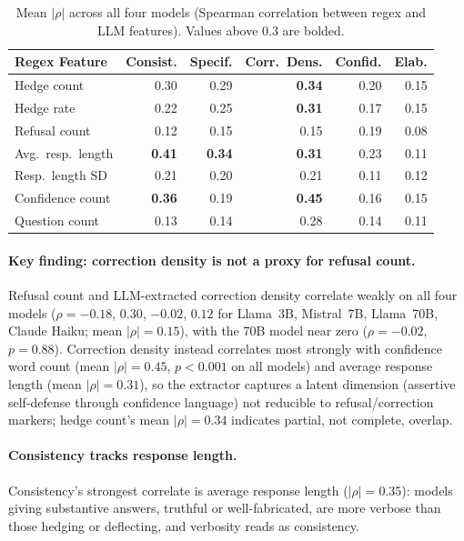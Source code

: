 \begin{table}[h]
\centering
\caption{Mean $|\rho|$ across all four models (Spearman correlation between regex and LLM features). Values above 0.3 are bolded.}
\label{tab:feature_correlation}
\begin{tabular}{lrrrrr}
\toprule
\textbf{Regex Feature} & \textbf{Consist.} & \textbf{Specif.} & \textbf{Corr.\ Dens.} & \textbf{Confid.} & \textbf{Elab.} \\
\midrule
Hedge count       & 0.30 & 0.29 & \textbf{0.34} & 0.20 & 0.15 \\
Hedge rate        & 0.22 & 0.25 & \textbf{0.31} & 0.17 & 0.15 \\
Refusal count     & 0.12 & 0.15 & 0.15          & 0.19 & 0.08 \\
Avg.\ resp.\ length & \textbf{0.41} & \textbf{0.34} & \textbf{0.31} & 0.23 & 0.11 \\
Resp.\ length SD  & 0.21 & 0.20 & 0.21          & 0.11 & 0.12 \\
Confidence count  & \textbf{0.36} & 0.19 & \textbf{0.45} & 0.16 & 0.15 \\
Question count    & 0.13 & 0.14 & 0.28          & 0.14 & 0.11 \\
\bottomrule
\end{tabular}
\end{table}

\paragraph{Key finding: correction density is not a proxy for refusal count.} Refusal count and LLM-extracted correction density correlate weakly on all four models ($\rho = -0.18$, $0.30$, $-0.02$, $0.12$ for Llama~3B, Mistral~7B, Llama~70B, Claude Haiku; mean $|\rho| = 0.15$), with the 70B model near zero ($\rho = -0.02$, $p = 0.88$). Correction density instead correlates most strongly with confidence word count (mean $|\rho| = 0.45$, $p < 0.001$ on all models) and average response length (mean $|\rho| = 0.31$), so the extractor captures a latent dimension (assertive self-defense through confidence language) not reducible to refusal/correction markers; hedge count's mean $|\rho| = 0.34$ indicates partial, not complete, overlap.

\paragraph{Consistency tracks response length.} Consistency's strongest correlate is average response length ($|\rho| = 0.35$): models giving substantive answers, truthful or well-fabricated, are more verbose than those hedging or deflecting, and verbosity reads as consistency.


